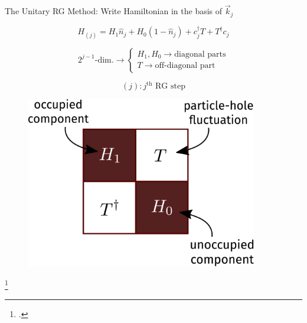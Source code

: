 \documentclass[11pt,aspectratio=169]{beamer}
\begin{document}
\begin{frame}{The Unitary RG Method: Write Hamiltonian in the basis of \(\vec k_j\)}

\vspace*{\fill}

\begin{minipage}{0.4\textwidth}
\[H_{(j)} = H_1 \hat n_j + H_0 \left(1 - \hat n_j\right) + c^\dagger_j T + T^\dagger c_j\]

\vspace*{\fill}

\[
{2^{j-1} \text{-dim.}} \longrightarrow \begin{cases}
H_1, H_0 \longrightarrow \text{diagonal parts}\\
T \longrightarrow \text{off-diagonal part}
\end{cases}
\]

\vspace*{\fill}

\[ (j) : j^\text{th} \text{ RG step}\]
\end{minipage}
\hspace*{\fill}
\begin{minipage}{0.5\textwidth}
\begin{figure}
	\includegraphics[width=0.9\textwidth]{figures/urg_ham.pdf}
\end{figure}
\end{minipage}

\vspace*{\fill}

\footcite{anirbanurg1,anirbanurg2}
\end{frame}
\end{document}
